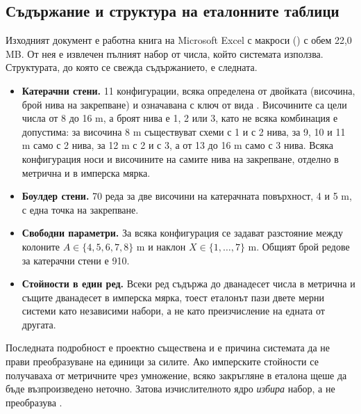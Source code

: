 \subsection{Съдържание и структура на еталонните таблици}
\label{subsec:tables}

Изходният документ е работна книга на Microsoft Excel с макроси
() с обем 22{,}0 MB. От нея е
извлечен пълният набор от числа, който системата използва. Структурата, до която се
свежда съдържанието, е следната.

\begin{itemize}[topsep=2pt,itemsep=2pt,leftmargin=*]
\item \textbf{Катерачни стени.} 11 конфигурации, всяка определена от двойката
      (височина, брой нива на закрепване) и означавана с ключ от вида .
      Височините са цели числа от 8 до 16 m, а броят нива е 1, 2 или 3, като не всяка
      комбинация е допустима: за височина 8 m съществуват схеми с 1 и с 2 нива, за
      9, 10 и 11 m само с 2 нива, за 12 m с 2 и с 3, а от 13 до 16 m само с 3 нива.
      Всяка конфигурация носи и височините на самите нива на закрепване, отделно в
      метрична и в имперска мярка.
\item \textbf{Боулдер стени.} 70 реда за две височини на катерачната повърхност,
      4 и 5 m, с една точка на закрепване.
\item \textbf{Свободни параметри.} За всяка конфигурация се задават разстояние между
      колоните $A \in \{4,5,6,7,8\}$ m и наклон $X \in \{1,\dots,7\}$ m. Общият брой
      редове за катерачни стени е 910.
\item \textbf{Стойности в един ред.} Всеки ред съдържа до дванадесет числа в метрична
      и същите дванадесет в имперска мярка, тоест еталонът пази двете мерни системи
      като независими набори, а не като преизчисление на едната от другата.
\end{itemize}

Последната подробност е проектно съществена и е причина системата да не прави
преобразуване на единици за силите. Ако имперските стойности се получаваха от
метричните чрез умножение, всяко закръгляне в еталона щеше да бъде възпроизведено
неточно. Затова изчислителното ядро \emph{избира} набор, а не преобразува
.

